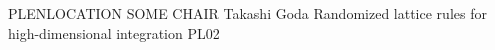 	{PLENLOCATION}	%
	{SOME CHAIR}		%
	{Takashi Goda }	%
	{Randomized lattice rules for high-dimensional integration}		%
	{PL02}			%
	\\\hline
